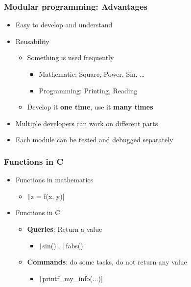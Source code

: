 \documentclass{../c-lecture}
\begin{document}
\begin{frame}
  \frametitle{Modular programming: Advantages}
  \begin{itemize}
    \item Easy to develop and understand
    \item Reusability
    \begin{itemize}
      \item Something is used frequently
      \begin{itemize}
        \item Mathematic: Square, Power, Sin, \ldots
        \item Programming: Printing, Reading
      \end{itemize}
      \item
        Develop it \textbf{\color{Orange} one time}, use it
        \textbf{\color{LimeGreen} many times}
    \end{itemize}
    \item Multiple developers can work on different parts
    \item Each module can be tested and debugged separately
  \end{itemize}
\end{frame}

\begin{frame}[fragile]
  \frametitle{Functions in C}
  \begin{itemize}
    \item Functions in mathematics
    \begin{itemize}
      \item \texttt|z = f(x, y)|
    \end{itemize}
    \item Functions in C
    \begin{itemize}
      \item \textbf{\color{YellowOrange} Queries}: Return a value
      \begin{itemize}
        \item \texttt|sin()|, \texttt|fabs()|
      \end{itemize}
      \item
        \textbf{\color{LimeGreen} Commands}: do some tasks, do not return
        any value
      \begin{itemize}
        \item \texttt|printf_my_info(...)|
      \end{itemize}
    \end{itemize}
  \end{itemize}
\end{frame}
\end{document}
